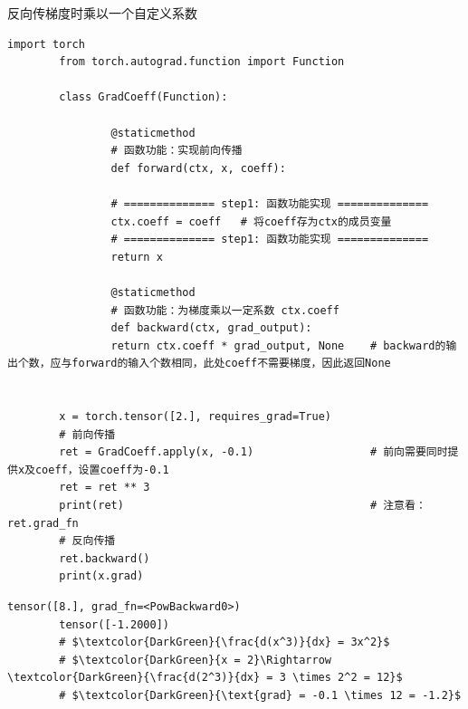 \begin{example}
        \exProblem
        反向传梯度时乘以一个自定义系数
        \exSolution
        \begin{lstlisting}[style=pythonstyle]
        import torch
        from torch.autograd.function import Function
        
        class GradCoeff(Function):       
        
                @staticmethod
                # 函数功能：实现前向传播
                def forward(ctx, x, coeff):                 
        
                # ============== step1: 函数功能实现 ==============
                ctx.coeff = coeff   # 将coeff存为ctx的成员变量
                # ============== step1: 函数功能实现 ==============
                return x
        
                @staticmethod
                # 函数功能：为梯度乘以一定系数 ctx.coeff
                def backward(ctx, grad_output):            
                return ctx.coeff * grad_output, None    # backward的输出个数，应与forward的输入个数相同，此处coeff不需要梯度，因此返回None
        
        
        x = torch.tensor([2.], requires_grad=True)
        # 前向传播
        ret = GradCoeff.apply(x, -0.1)                  # 前向需要同时提供x及coeff，设置coeff为-0.1
        ret = ret ** 3                         
        print(ret)                                      # 注意看： ret.grad_fn 
        # 反向传播
        ret.backward()  
        print(x.grad)
        \end{lstlisting}
        \begin{lstlisting}[style=demostyle, numbers=none, mathescape=true]
        tensor([8.], grad_fn=<PowBackward0>)
        tensor([-1.2000])
        # $\textcolor{DarkGreen}{\frac{d(x^3)}{dx} = 3x^2}$
        # $\textcolor{DarkGreen}{x = 2}\Rightarrow \textcolor{DarkGreen}{\frac{d(2^3)}{dx} = 3 \times 2^2 = 12}$
        # $\textcolor{DarkGreen}{\text{grad} = -0.1 \times 12 = -1.2}$
        \end{lstlisting}
\end{example}

